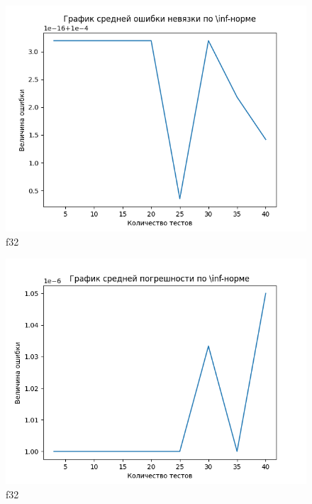 \documentclass[12pt]{article}
\begin{document}
	\begin{figure}[h]
		\centering
		\includegraphics[width=16cm]{"../plots/plot-total-t1-f32.png"}
		\caption{f32}
		\label{fig:t-t1-f32}
	\end{figure}
	
	\begin{figure}[h]
		\centering
		\includegraphics[width=16cm]{"../plots/plot-total-t2-f32.png"}
		\caption{f32}
		\label{fig:t-t2-f32}
	\end{figure}
	
\end{document}
